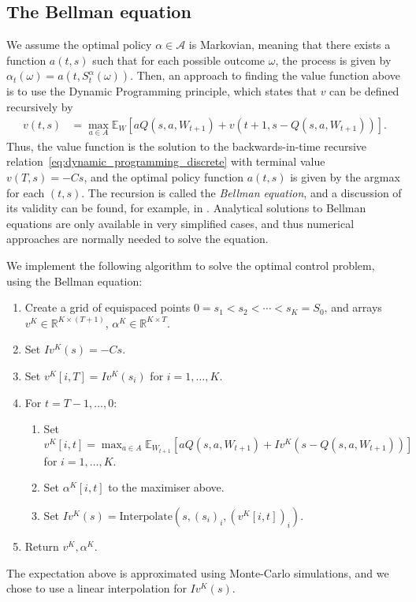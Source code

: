 \documentclass[main.tex]{subfiles}
\begin{document}
\subsection{The Bellman equation}
We assume the optimal policy $\alpha\in\mathcal A$ is Markovian,
meaning that
there exists a function $a(t,s)$ such that for each possible outcome
$\omega$, the process is given by
$\alpha_t(\omega) =
a(t,S_t^\alpha(\omega))$.
Then,
an approach to finding the value function above is to use the Dynamic
Programming principle, which states that $v$ can be defined
recursively by
\begin{align}\label{eq:dynamic_programming_discrete}
  v(t,s)&=\max_{a\in A}\mathbb E_{W}\left[
          aQ(s,a,W_{t+1})
          +v(t+1,s-Q(s,a,W_{t+1}))\right].
\end{align}
Thus, the value function is the solution to the backwards-in-time
recursive relation~\eqref{eq:dynamic_programming_discrete} with
terminal value $v(T,s)=-Cs$, and the optimal policy
function $a(t,s)$ is given by the argmax for each $(t,s)$.
The recursion is called the \emph{Bellman equation}, and a discussion
of its validity can be found, for example, in
\citet{bertsekas2005dynamic}.
Analytical solutions to Bellman equations are only available in very
simplified cases, and thus numerical approaches are normally needed to
solve the equation.

We implement the following algorithm to solve the optimal control
problem, using the Bellman equation:
\begin{enumerate}
\item Create a grid of equispaced points $0=s_1<s_2<\cdots<s_K=S_0$, and arrays $v^K\in\mathbb R^{K\times(T+1)}$,
  $\alpha^K\in\mathbb R^{K\times T}$.
\item Set $Iv^K(s)=-Cs$.
\item Set $v^K[i,T]=Iv^K(s_i)$ for $i=1,\dots, K$.
\item For $t = T-1,\dots,0$:
  \begin{enumerate}
  \item Set $\displaystyle v^K[i,t]=\max_{a\in A}\mathbb E_{W_{t+1}}\left[ aQ(s,a,W_{t+1})
      +Iv^K(s-Q(s,a,W_{t+1}))\right]$\\ for $i=1,\dots,K$.
  \item Set $\alpha^K[i,t]$ to the maximiser above.
  \item Set $Iv^K(s) = \mathrm{Interpolate}(s, {(s_i)}_i,{(v^K[i,t])}_i)$.
  \end{enumerate}
\item Return $v^K,\alpha^K$.
\end{enumerate}
The expectation above is approximated using Monte-Carlo simulations, and
we chose to use a linear interpolation for $Iv^K(s)$.
\end{document}
